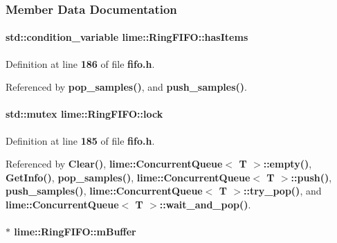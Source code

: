 \subsubsection{Member Data Documentation}
\paragraph[{has\+Items}]{\setlength{\rightskip}{0pt plus 5cm}std\+::condition\+\_\+variable lime\+::\+Ring\+F\+I\+F\+O\+::has\+Items\hspace{0.3cm}{\ttfamily [protected]}}\label{classlime_1_1RingFIFO_a5916b95554475303110371a3dc022c24}


Definition at line {\bf 186} of file {\bf fifo.\+h}.



Referenced by {\bf pop\+\_\+samples()}, and {\bf push\+\_\+samples()}.

\paragraph[{lock}]{\setlength{\rightskip}{0pt plus 5cm}std\+::mutex lime\+::\+Ring\+F\+I\+F\+O\+::lock\hspace{0.3cm}{\ttfamily [protected]}}\label{classlime_1_1RingFIFO_a71a641d759a357d3f0d011100b179872}


Definition at line {\bf 185} of file {\bf fifo.\+h}.



Referenced by {\bf Clear()}, {\bf lime\+::\+Concurrent\+Queue$<$ T $>$\+::empty()}, {\bf Get\+Info()}, {\bf pop\+\_\+samples()}, {\bf lime\+::\+Concurrent\+Queue$<$ T $>$\+::push()}, {\bf push\+\_\+samples()}, {\bf lime\+::\+Concurrent\+Queue$<$ T $>$\+::try\+\_\+pop()}, and {\bf lime\+::\+Concurrent\+Queue$<$ T $>$\+::wait\+\_\+and\+\_\+pop()}.

\paragraph[{m\+Buffer}]{$\ast$ lime\+::\+Ring\+F\+I\+F\+O\+::m\+Buffer\hspace{0.3cm}{\ttfamily [protected]}}\label{classlime_1_1RingFIFO_ad3b9ef198edb51819d6500638d83a2df}


